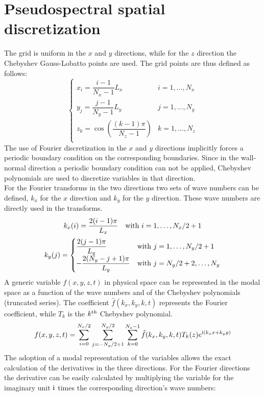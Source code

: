 \section{Pseudospectral spatial discretization}
\label{sec: pseudosp}
The grid is uniform in the $x$ and $y$ directions, while for the $z$ direction the Chebyshev Gauss-Lobatto points are used. The grid points are thus defined as follows:
\[
\begin{cases}
x_i=\dfrac{i-1}{N_x-1}L_x  & i=1,\dots,N_x \\[3ex]
y_j=\dfrac{j-1}{N_y-1}L_y  & j=1,\dots,N_y \\[3ex]
z_k=\cos \left(\dfrac{(k-1)\pi}{N_z-1}\right)  & k=1,\dots,N_z\\
\end{cases}
\]
The use of Fourier discretization in the $x$ and $y$ directions implicitly forces a periodic boundary condition on the corresponding boundaries. Since in the wall-normal direction a periodic boundary condition can not be applied, Chebyshev polynomials are used to discretize variables in that direction.\\
For the Fourier transforms in the two directions two sets of wave numbers can be defined, $k_x$ for the $x$ direction and $k_y$ for the $y$ direction. These wave numbers are directly used in the transforms.
\[
\begin{array}{ll}
k_x(i)=\dfrac{2(i-1)\pi}{L_x} & \textnormal{with }i=1,\dots,N_x/2+1
\end{array}
\]
\[
k_y(j)=
\begin{cases}
\dfrac{2(j-1)\pi}{L_y} & \textnormal{with } j=1,\dots,N_y/2+1 \\
-\dfrac{2(N_y-j+1)\pi}{L_y}  & \textnormal{with } j=N_y/2+2,\dots,N_y \\
\end{cases}
\]
A generic variable $f(x,y,z,t)$ in physical space can be represented in the modal space as a function of the wave numbers and of the Chebyshev polynomials (truncated series). The coefficient $\hat f(k_x,k_y,k,t)$ represents the Fourier coefficient, while $T_k$ is the $k^{\textnormal{th}}$ Chebyshev polynomial. 
\[
f(x,y,z,t)=\sum_{i=0}^{N_x/2}\sum_{j=-N_y/2+1}^{N_y/2}\sum_{k=0}^{N_z-1}\hat f(k_x,k_y,k,t)T_{k}(z)e^{\textnormal{i}(k_xx+k_yy)}
\]
The adoption of a modal representation of the variables allows the exact calculation of the derivatives in the three directions. For the Fourier directions the derivative can be easily calculated by multiplying the variable for the imaginary unit $\textnormal{i}$ times the corresponding direction's wave numbers:
